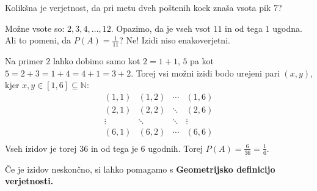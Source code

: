 \documentclass[12pt]{book}
\def\n{\noindent}
\theoremstyle{definition}
\theoremstyle{plain}
\theoremstyle{plain}
\theoremstyle{plain}
\theoremstyle{remark}
\begin{document}
\begin{zgled}
    Kolikšna je verjetnost, da pri metu dveh poštenih kock znaša vsota pik $7$?
    
    Možne vsote so: $2, 3, 4, \dots , 12$. Opazimo, da je vseh vsot $11$ in od tega $1$ ugodna. Ali to pomeni, da $P(A)=\frac{1}{11}$? Ne! Izidi niso enakoverjetni. 
    
    \n Na primer $2$ lahko dobimo samo kot $2=1+1$, $5$ pa kot $5=2+3=1+4=4+1=3+2$. Torej vsi možni izidi bodo urejeni pari $(x, y)$, kjer $x, y \in[1,6] \subseteq \mathbb{N}$:
    $$
    \begin{array}{cccc}
        (1,1) & (1,2) & \cdots & (1,6) \\
        (2,1) & (2,2) & \ddots & (2,6)\\
        \vdots & \ddots & \ddots & \vdots \\
        (6,1) & (6,2) & \cdots & (6,6) \\
    \end{array}
    $$
    Vseh izidov je torej $36$ in od tega je $6$ ugodnih. Torej $P(A)= \frac{6}{36}=\frac{1}{6}$.
\end{zgled}

\n Če je izidov neskončno, si lahko pomagamo s \textbf{Geometrijsko definicijo verjetnosti.}
\end{document}
